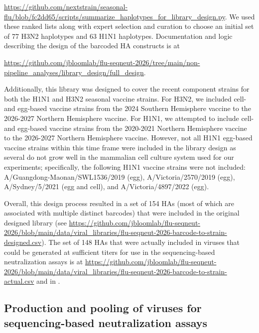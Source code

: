 \href{https://github.com/nextstrain/seasonal-flu/blob/fc2dd65/scripts/summarize_haplotypes_for_library_design.py}{https://github.com/nextstrain/seasonal-flu/blob/fc2dd65/scripts/summarize\_haplotypes\_for\_library\_design.py}. We used these ranked lists along with expert selection and curation to choose an initial set of 77 H3N2 haplotypes and 63 H1N1 haplotypes. Documentation and logic describing the design of the barcoded HA constructs is at

\href{https://github.com/jbloomlab/flu-seqneut-2026/tree/main/non-pipeline_analyses/library_design/full_design}{https://github.com/jbloomlab/flu-seqneut-2026/tree/main/non-pipeline\_analyses/library\_design/full\_design}.

Additionally, this library was designed to cover the recent component strains for both the H1N1 and H3N2 seasonal vaccine strains. For H3N2, we included cell- and egg-based vaccine strains from the 2024 Southern Hemisphere vaccine to the 2026-2027 Northern Hemisphere vaccine. For H1N1, we attempted to include cell- and egg-based vaccine strains from the 2020-2021 Northern Hemisphere vaccine to the 2026-2027 Northern Hemisphere vaccine. However, not all H1N1 egg-based vaccine strains within this time frame were included in the library design as several do not grow well in the mammalian cell culture system used for our experiments; specifically, the following H1N1 vaccine strains were not included: A/Guangdong-Maonan/SWL1536/2019 (egg), A/Victoria/2570/2019 (egg), A/Sydney/5/2021 (egg and cell), and A/Victoria/4897/2022 (egg).

Overall, this design process resulted in a set of 154 HAs (most of which are associated with multiple distinct barcodes) that were included in the original designed library (see \href{https://github.com/jbloomlab/flu-seqneut-2026/blob/main/data/viral_libraries/flu-seqneut-2026-barcode-to-strain-designed.csv}{https://github.com/jbloomlab/flu-seqneut-2026/blob/main/data/viral\_libraries/flu-seqneut-2026-barcode-to-strain-designed.csv}). The set of 148 HAs that were actually included in viruses that could be generated at sufficient titers for use in the sequencing-based neutralization assays is at \href{https://github.com/jbloomlab/flu-seqneut-2026/blob/main/data/viral_libraries/flu-seqneut-2026-barcode-to-strain-actual.csv}{https://github.com/jbloomlab/flu-seqneut-2026/blob/main/data/viral\_libraries/flu-seqneut-2026-barcode-to-strain-actual.csv} and in \textbf{}.

\subsection{Production and pooling of viruses for sequencing-based neutralization assays}

